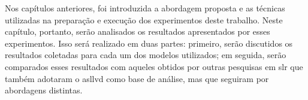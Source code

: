 Nos capítulos anteriores, foi introduzida a abordagem proposta e as técnicas utilizadas na preparação e execução dos experimentos deste trabalho.
Neste capítulo, portanto, serão analisados os resultados apresentados por esses experimentos.
Isso será realizado em duas partes: 
primeiro, serão discutidos os resultados coletadas para cada um dos modelos utilizados; em seguida, serão comparados esses resultados com aqueles obtidos por outras pesquisas em \acrfull{slr} que também adotaram o \acrfull{asllvd} como base de análise, mas que seguiram por abordagens distintas.
